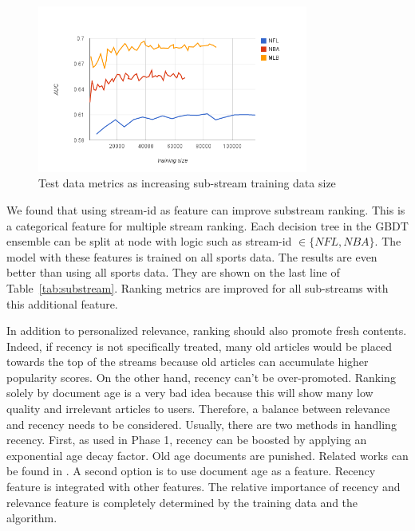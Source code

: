 \begin{figure}
\caption{Test data metrics as increasing sub-stream training data 
size}\label{fig:curve}
\centering
\includegraphics[width=3.5in]{training-curve.png}

\end{figure}

We found that using stream-id as feature can improve substream ranking. This 
is a categorical feature for multiple stream ranking. Each decision tree in 
the GBDT ensemble can be split at node with logic such as stream-id $\in 
\{NFL,NBA\}$.  The model with these features is trained on all sports data.  
The results are even better than using all sports data. They are shown on the 
last line of  Table~\ref{tab:substream}. Ranking metrics are improved for all 
sub-streams with this additional feature.
 




  
 In addition to personalized relevance, ranking should also promote fresh 
 contents.  Indeed, if recency is not specifically treated,  many old articles 
 would be placed towards the top of the streams because old articles can 
 accumulate 
 higher popularity scores. On the other hand, recency can't be over-promoted.  
 Ranking solely by document age is a very bad idea because this will show many 
 low quality and irrelevant articles to users. Therefore, a balance between 
 relevance and recency needs to be considered.  Usually, there are two methods 
 in handling recency. First, as used in Phase 1, recency can be boosted by 
 applying an exponential age decay factor. Old age documents are punished.  
 Related works can be found in 
 \cite{Li:2003:TLM:956863.956951,Metzler:2009:ISR:1571941.1572085}. A second 
 option is to use document age as a feature. Recency feature is integrated 
 with other features. The relative importance of recency and relevance feature 
 is 
 completely determined by the training data and the algorithm. 
 
